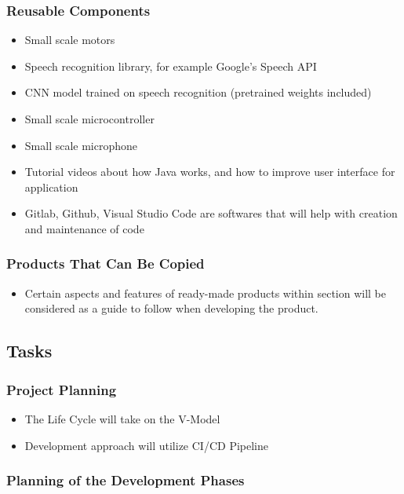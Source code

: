 \documentclass[12pt]{article}
\begin{document}
\subsubsection{Reusable Components}
\begin{itemize}
  \item Small scale motors
  \item Speech recognition library, for example Google’s Speech API
  \item CNN model trained on speech recognition (pretrained weights included) 
  \item Small scale microcontroller
  \item Small scale microphone
  \item Tutorial videos about how Java works, and how to improve user interface for application
  \item Gitlab, Github, Visual Studio Code are softwares that will help with creation and maintenance of code
\end{itemize}
\subsubsection{Products That Can Be Copied}
\begin{itemize}
  \item Certain aspects and features of ready-made products within section  will be considered as a guide to follow when developing the product.
\end{itemize}
\subsection{Tasks}

\subsubsection{Project Planning}

\begin{itemize}
  \item The Life Cycle will take on the V-Model
  \item Development approach will utilize CI/CD Pipeline
\end{itemize}

\subsubsection{Planning of the Development Phases}
\end{document}
